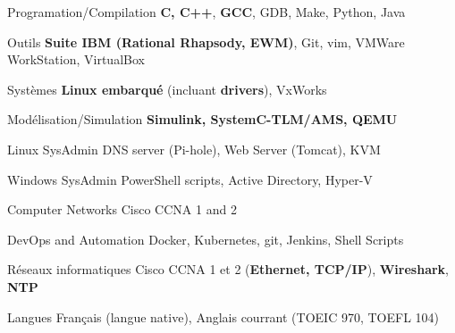 

\begin{cvskills}
{

    \cvskill
    {Programation/Compilation} %
    {\textbf{C, C++}, \textbf{GCC}, GDB, Make, Python, Java} %

    \cvskill
    {Outils}
    {\textbf{Suite IBM (Rational Rhapsody, EWM)}, Git, vim, VMWare WorkStation, VirtualBox}
	
	\cvskill
    {Systèmes}
    {\textbf{Linux embarqué} (incluant \textbf{drivers}), VxWorks}
	
    \cvskill
    {Modélisation/Simulation} %
    {\textbf{Simulink, SystemC-TLM/AMS, QEMU}} %

	}{}
{

    \cvskill
    {Linux SysAdmin} %
    {DNS server (Pi-hole), Web Server (Tomcat), KVM} %

    \cvskill
    {Windows SysAdmin} %
    {PowerShell scripts, Active Directory, Hyper-V} %

    \cvskill
    {Computer Networks} %
    {Cisco CCNA 1 and 2} %
	
	\cvskill
    {DevOps and Automation} %
    {Docker, Kubernetes, git, Jenkins, Shell Scripts} %

}{}
    \cvskill
    {Réseaux informatiques} %
    {Cisco CCNA 1 et 2 (\textbf{Ethernet, TCP/IP}), \textbf{Wireshark}, \textbf{NTP}} %

    \cvskill
    {Langues} %
    {Français (langue native), Anglais courrant (TOEIC 970, TOEFL 104)} %

\end{cvskills}
